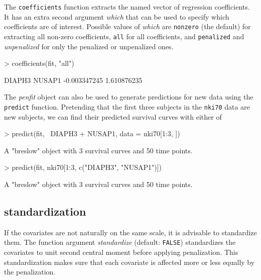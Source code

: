 \documentclass[a4paper]{article}
\newcommand{\Robject}[1]{{\texttt{#1}}}
\newcommand{\Rfunction}[1]{{\texttt{#1}}}
\newcommand{\Rclass}[1]{{\textit{#1}}}
\newcommand{\Rfunarg}[1]{{\textit{#1}}}
\begin{document}
The \Rfunction{coefficients} function extracts the named vector of regression coefficients. It has an extra second argument \Rfunarg{which} that can be used to specify which coefficients are of interest. Possible values of \Rfunarg{which} are \Robject{nonzero} (the default) for extracting all non-zero coefficients, \Robject{all} for all coefficients, and \Robject{penalized} and \Rfunarg{unpenalized} for only the penalized or unpenalized ones.

\begin{Schunk}
\begin{Sinput}
> coefficients(fit, "all")
\end{Sinput}
\begin{Soutput}
      DIAPH3       NUSAP1 
-0.003347245  1.610876235 
\end{Soutput}
\end{Schunk}

The \Rclass{penfit} object can also be used to generate predictions for new data using the \Rfunction{predict} function. Pretending that the first three subjects in the \Robject{nki70} data are new subjects, we can find their predicted survival curves with either of

\begin{Schunk}
\begin{Sinput}
> predict(fit, ~DIAPH3 + NUSAP1, data = nki70[1:3, ])
\end{Sinput}
\begin{Soutput}
A "breslow" object with 3 survival curves and 50 time points.
\end{Soutput}
\begin{Sinput}
> predict(fit, nki70[1:3, c("DIAPH3", "NUSAP1")])
\end{Sinput}
\begin{Soutput}
A "breslow" object with 3 survival curves and 50 time points.
\end{Soutput}
\end{Schunk}


\subsection{standardization}

If the covariates are not naturally on the same scale, it is advisable to standardize them. The function argument \Rfunarg{standardize} (default: \Robject{FALSE}) standardizes the covariates to unit second central moment before applying penalization. This standardization makes sure that each covariate is affected more or less equally by the penalization.
\end{document}
